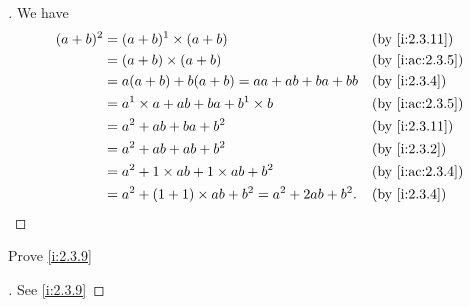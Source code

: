 \begin{proof}[]
  We have
  \begin{align*}
    (a + b)^2 & = (a + b)^1 \times (a + b)                         &  & \by{i:2.3.11}   \\
              & = (a + b) \times (a + b)                           &  & \by{i:ac:2.3.5} \\
              & = a(a + b) + b(a + b) = aa + ab + ba + bb          &  & \by{i:2.3.4}    \\
              & = a^1 \times a + ab + ba + b^1 \times b            &  & \by{i:ac:2.3.5} \\
              & = a^2 + ab + ba + b^2                              &  & \by{i:2.3.11}   \\
              & = a^2 + ab + ab + b^2                              &  & \by{i:2.3.2}    \\
              & = a^2 + 1 \times ab + 1 \times ab + b^2            &  & \by{i:ac:2.3.4} \\
              & = a^2 + (1 + 1) \times ab + b^2 = a^2 + 2ab + b^2. &  & \by{i:2.3.4}
  \end{align*}
\end{proof}

\begin{ex}\label{i:ex:2.3.5}
  Prove \cref{i:2.3.9}
\end{ex}

\begin{proof}[]
  See \cref{i:2.3.9}
\end{proof}
